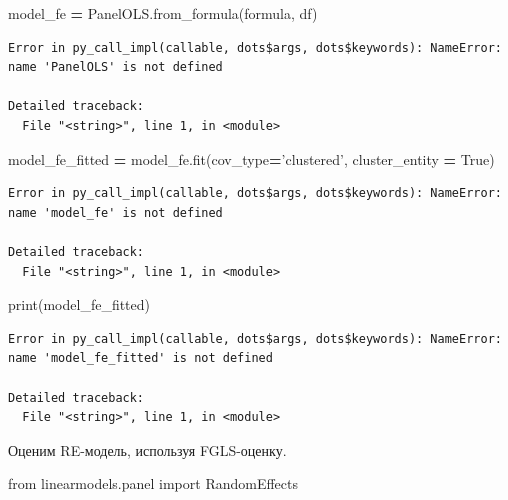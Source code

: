 \documentclass[]{book}
\newenvironment{Shaded}{\begin{snugshade}}{\end{snugshade}}
\newcommand{\BuiltInTok}[1]{#1}
\newcommand{\ImportTok}[1]{#1}
\newcommand{\NormalTok}[1]{#1}
\newcommand{\OperatorTok}[1]{\textcolor[rgb]{0.81,0.36,0.00}{\textbf{#1}}}
\newcommand{\StringTok}[1]{\textcolor[rgb]{0.31,0.60,0.02}{#1}}
\newcommand{\VariableTok}[1]{\textcolor[rgb]{0.00,0.00,0.00}{#1}}
\begin{document}
\begin{Shaded}
\begin{Highlighting}[]
\NormalTok{model_fe }\OperatorTok{=}\NormalTok{ PanelOLS.from_formula(formula, df)}
\end{Highlighting}
\end{Shaded}

\begin{verbatim}
Error in py_call_impl(callable, dots$args, dots$keywords): NameError: name 'PanelOLS' is not defined

Detailed traceback: 
  File "<string>", line 1, in <module>
\end{verbatim}

\begin{Shaded}
\begin{Highlighting}[]
\NormalTok{model_fe_fitted }\OperatorTok{=}\NormalTok{ model_fe.fit(cov_type}\OperatorTok{=}\StringTok{'clustered'}\NormalTok{, cluster_entity }\OperatorTok{=} \VariableTok{True}\NormalTok{)}
\end{Highlighting}
\end{Shaded}

\begin{verbatim}
Error in py_call_impl(callable, dots$args, dots$keywords): NameError: name 'model_fe' is not defined

Detailed traceback: 
  File "<string>", line 1, in <module>
\end{verbatim}

\begin{Shaded}
\begin{Highlighting}[]
\BuiltInTok{print}\NormalTok{(model_fe_fitted)}
\end{Highlighting}
\end{Shaded}

\begin{verbatim}
Error in py_call_impl(callable, dots$args, dots$keywords): NameError: name 'model_fe_fitted' is not defined

Detailed traceback: 
  File "<string>", line 1, in <module>
\end{verbatim}

Оценим RE-модель, используя FGLS-оценку.

\begin{Shaded}
\begin{Highlighting}[]
\ImportTok{from}\NormalTok{ linearmodels.panel }\ImportTok{import}\NormalTok{ RandomEffects}
\end{Highlighting}
\end{Shaded}
\end{document}
